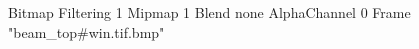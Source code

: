 {Bitmap
	{Filtering 1}
	{Mipmap 1}
	{Blend none}
	{AlphaChannel 0}
	{Frame "beam_top#win.tif.bmp"}
}
